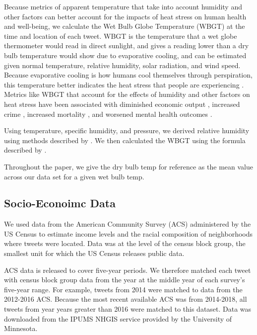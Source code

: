 \documentclass[fleqn,10pt]{wlscirep}
\begin{document}
Because metrics of apparent temperature that take into account humidity and other factors can better account for the impacts of heat stress on human health and well-being, we calculate the Wet Bulb Globe Temperature (WBGT) at the time and location of each tweet.  WBGT is the temperature that a wet globe thermometer would read in direct sunlight, and gives a reading lower than a dry bulb temperature would show due to evaporative cooling, and can be estimated given normal temperature, relative humidity, solar radiation, and wind speed.  Because evaporative cooling is how humans cool themselves through perspiration, this temperature better indicates the heat stress that people are experiencing \cite{budd2008wet}.  Metrics like WBGT that account for the effects of humidity and other factors on heat stress have been associated with diminished economic output \cite{rao2020projections}, increased crime \cite{hu2017impact}, increased mortality \cite{chien2016spatiotemporal, armstrong2019role}, and worsened mental health outcomes \cite{vida2012relationship, ding2016importance}.

Using temperature, specific humidity, and pressure, we derived relative humidity using methods described by  \cite{bolton_computation_1980}.  We then calculated the WBGT using the formula described by \cite{heo2019comparison}.

Throughout the paper, we give the dry bulb temp for reference as the mean value across our data set for a given wet bulb temp.

\subsection*{Socio-Econoimc Data}
We used data from the American Community Survey (ACS) administered by the US Census to estimate income levels and the racial composition of neighborhoods where tweets were located.  Data was at the level of the census block group, the smallest unit for which the US Census releases public data.

ACS data is released to cover five-year periods.  We therefore matched each tweet with census block group data from the year at the middle year of each survey's five-year range.  For example, tweets from 2014 were matched to data from the 2012-2016 ACS.  Because the most recent available ACS was from 2014-2018, all tweets from year years greater than 2016 were matched to this dataset.  Data was downloaded from the IPUMS NHGIS service provided by the University of Minnesota.
\end{document}
